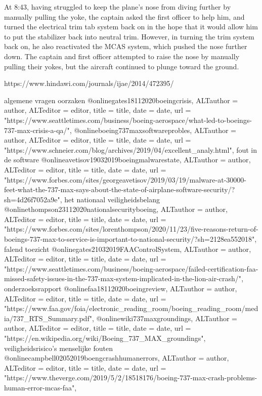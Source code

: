 {{{{{{{{{At 8:43, having struggled to keep the plane's nose from diving further by manually pulling the yoke, the captain asked the first officer to help him, and turned the electrical trim tab system back on in the hope that it would allow him to put the stabilizer back into neutral trim. However, in turning the trim system back on, he also reactivated the MCAS system, which pushed the nose further down. The captain and first officer attempted to raise the nose by manually pulling their yokes, but the aircraft continued to plunge toward the ground.

https://www.hindawi.com/journals/ijae/2014/472395/ 
\cite{caliskan09112013747boeingkalman}

algemene vragen
oorzaken
@online{gates18112020boeingcrisis,	ALTauthor = {author},	ALTeditor = {editor},	title = {title},	date = {date},	url = {"https://www.seattletimes.com/business/boeing-aerospace/what-led-to-boeings-737-max-crisis-a-qa/"},}
@online{boeing737maxsoftwareprobles,	ALTauthor = {author},	ALTeditor = {editor},	title = {title},	date = {date},	url = {"https://www.schneier.com/blog/archives/2019/04/excellent_analy.html"},}
fout in de software
@online{avetisov19032019boeingmalwarestate,	ALTauthor = {author},	ALTeditor = {editor},	title = {title},	date = {date},	url = {"https://www.forbes.com/sites/georgeavetisov/2019/03/19/malware-at-30000-feet-what-the-737-max-says-about-the-state-of-airplane-software-security/?sh=4d26f7052a9e"},}
het nationaal veiligheidsbelang
@online{thompson23112020nationalsecurityboeing,	ALTauthor = {author},	ALTeditor = {editor},	title = {title},	date = {date},	url = {"https://www.forbes.com/sites/lorenthompson/2020/11/23/five-reasons-return-of-boeings-737-max-to-service-is-important-to-national-security/?sh=2128ea552018"},}
falend toezicht
@online{gates21032019FAAControlSystem,	ALTauthor = {author},	ALTeditor = {editor},	title = {title},	date = {date},	url = {"https://www.seattletimes.com/business/boeing-aerospace/failed-certification-faa-missed-safety-issues-in-the-737-max-system-implicated-in-the-lion-air-crash/"},}
onderzoeksrapport
@online{faa18112020boeingreview,	ALTauthor = {author},	ALTeditor = {editor},	title = {title},	date = {date},	url = {"https://www.faa.gov/foia/electronic_reading_room/boeing_reading_room/media/737_RTS_Summary.pdf"},}
@online{wiki737maxgroundings,	ALTauthor = {author},	ALTeditor = {editor},	title = {title},	date = {date},	url = {"https://en.wikipedia.org/wiki/Boeing_737_MAX_groundings"},}
veiligheidsrisico's
menselijke fouten
@online{campbell02052019boengcrashhumanerrors,	ALTauthor = {author},	ALTeditor = {editor},	title = {title},	date = {date},	url = {"https://www.theverge.com/2019/5/2/18518176/boeing-737-max-crash-problems-human-error-mcas-faa"},}
}}}}}}}}}
